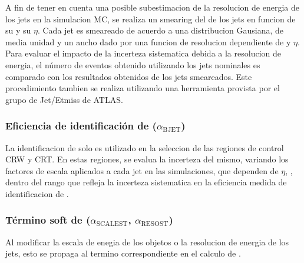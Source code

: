 A fin de tener en cuenta una posible subestimacion de la resolucion de energia de los jets
en la simulacion MC, se realiza un smearing del {\pt} de los jets en funcion de su \pt y su $\eta$.
Cada jet es smeareado de acuerdo a una distribucion Gausiana, de media unidad y un ancho
dado por una funcion de resolucion dependiente de {\pt} y $\eta$. Para evaluar el impacto
de la incerteza sistematica debida a la resolucion de energia, el número de eventos obtenido utilizando
los jets nominales es comparado con los resultados obtenidos de los jets smeareados.
Este procedimiento tambien se realiza utilizando una herramienta provista por el grupo de Jet/Etmiss
de ATLAS.


\subsubsection{Eficiencia de identificación de {\bjets} ($\alpha_\text{BJET}$)}

La identificacion de {\bjets} solo es utilizado en la seleccion de las regiones de control CRW y CRT.
En estas regiones, se evalua la incerteza del mismo, variando los factores de escala
aplicados a cada jet en las simulaciones, que dependen de $\eta$, {\pt}, dentro del rango
que refleja la incerteza sistematica en la eficiencia medida de identificacion de {\bjets}.




\subsubsection{Término soft de \MET ($\alpha_\text{SCALEST}$, $\alpha_\text{RESOST}$)}

Al modificar la escala de enegia de los objetos o la resolucion de energia de los jets, esto
se propaga al termino correspondiente en el calculo de {\met}.

